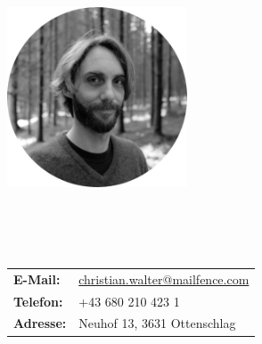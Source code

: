 
{
\begin{multicols}{2}

  \begingroup \centering \includegraphics[width=0.4\textwidth]{./figs/chris.jpg} \endgroup\\

  \vspace{0.5cm}

  \\

  \\\\
  \begin{tabular} { l l }
    \textbf{E-Mail:} & \href{mailto:christian.walter@mailfence.com}{christian.walter@mailfence.com}\\
    \textbf{Telefon:} & +43 680 210 423 1\\
    \textbf{Adresse:} & Neuhof 13, 3631 Ottenschlag\\
  \end{tabular}

\end{multicols}
}
